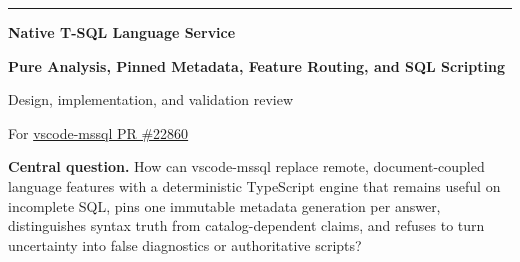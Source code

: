 \documentclass[11pt]{article}
\begin{document}
\hypersetup{pageanchor=false}

\begin{titlepage}
\thispagestyle{empty}
\enlargethispage{0.28in}
\vspace*{0.22in}

{\color{violetdark}\rule{\textwidth}{2.2pt}}
\vspace{0.18in}

{\Huge\bfseries\color{ink} Native T-SQL Language Service\par}
\vspace{0.08in}
{\LARGE\bfseries\color{violetdark} Pure Analysis, Pinned Metadata, Feature Routing, and SQL Scripting\par}
\vspace{0.10in}
{\Large\color{slate} Design, implementation, and validation review\par}

\vspace{0.20in}
{\large For \href{https://github.com/microsoft/vscode-mssql/pull/22860}{vscode-mssql PR \#22860}\par}

\vspace{0.20in}
\begin{tcolorbox}[enhanced,colback=lavender,colframe=violet,boxrule=1pt,arc=2mm,left=4mm,right=4mm,top=2.6mm,bottom=2.6mm]
\textbf{Central question.} How can vscode-mssql replace remote, document-coupled language features with a deterministic TypeScript engine that remains useful on incomplete SQL, pins one immutable metadata generation per answer, distinguishes syntax truth from catalog-dependent claims, and refuses to turn uncertainty into false diagnostics or authoritative scripts?
\end{tcolorbox}


\end{titlepage}
\end{document}
